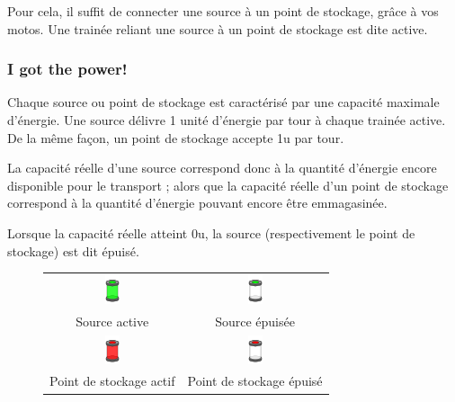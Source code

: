 Pour cela, il suffit de connecter une source à un point de stockage,
grâce à vos motos. Une trainée reliant une source à un point de
stockage est dite active.\\

\subsubsection{I got the power!}

Chaque source ou point de stockage est caractérisé par une capacité
maximale d'énergie. Une source délivre 1 unité d'énergie par tour à
chaque trainée active. De la même façon, un point de stockage accepte
1u par tour.

La capacité réelle d'une source correspond donc à la quantité
d'énergie encore disponible pour le transport ; alors que la capacité
réelle d'un point de stockage correspond à la quantité d'énergie
pouvant encore être emmagasinée.

Lorsque la capacité réelle atteint 0u, la source (respectivement le
point de stockage) est dit épuisé.\\

\begin{figure}[!h]
\centering
\begin{tabular}{c|c}
    \includegraphics{../data/graphics/source_energie-on-producteur.png}

 &

    \includegraphics{../data/graphics/source_energie-off-producteur.png}
\\
        Source active & Source épuisée \\ \hline

    \includegraphics{../data/graphics/source_energie-on-consommateur.png}

&

    \includegraphics{../data/graphics/source_energie-off-consommateur.png}
\\
        Point de stockage actif & Point de stockage épuisé

\end{tabular}
\end{figure}

